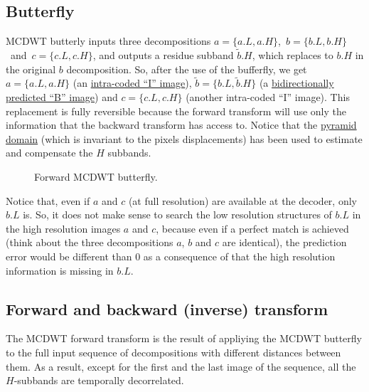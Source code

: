 \subsection{Butterfly}
\label{sec:butterfly}

MCDWT butterly inputs three decompositions $a=\{a.L, a.H\}$,~$b=\{b.L,
b.H\}$~and~$c=\{c.L, c.H\}$, and outputs a residue subband
$\tilde{b}.H$, which replaces to $b.H$ in the original $b$
decomposition. So, after the use of the bufferfly, we get $a=\{a.L,
a.H\}$ (an
\href{https://en.wikipedia.org/wiki/Video_compression_picture_types}{intra-coded
  ``I'' image}), $\tilde{b}=\{b.L, \tilde{b}.H\}$ (a
\href{https://en.wikipedia.org/wiki/Video_compression_picture_types}{bidirectionally
  predicted ``B'' image}) and $c=\{c.L, c.H\}$ (another intra-coded
``I'' image). This replacement is fully reversible because the forward
transform will use only the information that the backward transform
has access to. Notice that the
\href{http://www.vtvt.ece.vt.edu/research/references/video/DCT_Video_Compression/Zhang92a.pdf}{pyramid
  domain} (which is invariant to the pixels displacements) has been
used to estimate and compensate the $H$ subbands.

\begin{figure}
  \centering %
  \caption{Forward MCDWT butterfly.} %
  \label{fig:forward_butterfly}
\end{figure}



Notice that, even if $a$ and $c$ (at full resolution) are available at
the decoder, only $b.L$ is. So, it does not make sense to search the
low resolution structures of $b.L$ in the high resolution images $a$
and $c$, because even if a perfect match is achieved (think about the
three decompositions $a$, $b$ and $c$ are identical), the prediction error
would be different than $0$ as a consequence of that the high
resolution information is missing in $b.L$.

\subsection{Forward and backward (inverse) transform}

The MCDWT forward transform is the result of appliying the MCDWT
butterfly to the full input sequence of decompositions with different
distances between them. As a result, except for the first and the last
image of the sequence, all the $H$-subbands are temporally
decorrelated.

